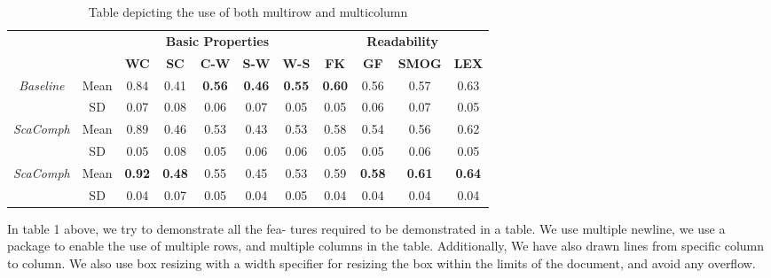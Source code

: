 \documentclass[a4paper, 11pt]{article}
\begin{document}
\begin{table}[h!]
\begin{adjustbox}{max width=\textwidth}
\begin{tabular}{|cc|c|c|c|c|c|c|c|c|c|c|}
	\cline{4-12}
	\multicolumn{3}{c|}{\multirow{2}{*}{}} & \multicolumn{5}{c}{\textbf{Basic Properties}} & \multicolumn{4}{|c|}{\textbf{Readability}} \\
	\cline{4-12}
	\multicolumn{3}{c|}{} & \textbf{WC} & \textbf{SC} & \textbf{C-W} & \textbf{S-W} & \textbf{W-S} & \textbf{FK} & \textbf{GF} & \textbf{SMOG} & \textbf{LEX} \\
	\hline
	\multicolumn{2}{|c|}{\multirow{2}{*}{\textit{Baseline}}} & Mean & 0.84 & 0.41 & \textbf{0.56} & \textbf{0.46} & \textbf{0.55} & \textbf{0.60} & 0.56 & 0.57 & 0.63 \\
	\cline{3-12}
	\multicolumn{2}{|c|}{} & SD & 0.07 & 0.08 & 0.06 & 0.07 & 0.05 & 0.05 & 0.06 & 0.07 & 0.05 \\
	\hline
	\hline
	\multicolumn{2}{|c|}{\multirow{2}{*}{\textit{ScaComph}}} & Mean & 0.89 & 0.46 & 0.53 & 0.43 & 0.53 & 0.58 & 0.54 & 0.56 & 0.62 \\
	\cline{3-12}
	\multicolumn{2}{|c|}{} & SD & 0.05 & 0.08 & 0.05 & 0.06 & 0.06 & 0.05 & 0.05 & 0.06 & 0.05 \\
	\hline
	\hline
	\multicolumn{2}{|c|}{\multirow{2}{*}{\textit{ScaComph}}} & Mean & \textbf{0.92} & \textbf{0.48} & 0.55 & 0.45 & 0.53 & 0.59 & \textbf{0.58} & \textbf{0.61} & \textbf{0.64} \\
	\cline{3-12}
	\multicolumn{2}{|c|}{} & SD & 0.04 & 0.07 & 0.05 & 0.04 & 0.05 & 0.04 & 0.04 & 0.04 & 0.04 \\
	\hline
	
\end{tabular}
\end{adjustbox}

\caption {Table depicting the use of both multirow and multicolumn}


\end{table}

{\Large In table 1 above, we try to demonstrate all the fea-
tures required to be demonstrated in a table. We use
multiple newline, we use a package to enable the use
of multiple rows, and multiple columns in the table.
Additionally, We have also drawn lines from specific
column to column. We also use box resizing with a
width specifier for resizing the box within the limits of
the document, and avoid any overflow.}
\end{document}
